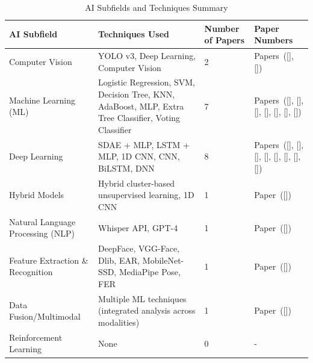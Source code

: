 \documentclass[twocolumn,12pt]{article}
\begin{document}
{\vspace{1em} %

\begin{table}[H]
\centering
\footnotesize               %
\setlength{\tabcolsep}{2pt} %
\renewcommand{\arraystretch}{.5} %
\caption{AI Subfields and Techniques Summary}
\begin{tabular}{|p{2cm}|p{3cm}|p{1.5cm}|p{2.5cm}|}
\hline
\textbf{AI Subfield} & \textbf{Techniques Used} & \textbf{Number of Papers} & \textbf{Paper Numbers} \\
\hline
Computer Vision & YOLO v3, Deep Learning, Computer Vision & 2 & Papers~([\citealp{ref1}], [\citealp{ref8}]) \\
\hline
Machine Learning (ML) & Logistic Regression, SVM, Decision Tree, KNN, AdaBoost, MLP, Extra Tree Classifier, Voting Classifier & 7 & Papers~([\citealp{ref2}], [\citealp{ref3}], [\citealp{ref7}], [\citealp{ref9}], [\citealp{ref10}], [\citealp{ref12}], [\citealp{ref13}]) \\
\hline
Deep Learning & SDAE + MLP, LSTM + MLP, 1D CNN, CNN, BiLSTM, DNN & 8 & Papers~([\citealp{ref3}], [\citealp{ref4}], [\citealp{ref6}], [\citealp{ref8}], [\citealp{ref11}], [\citealp{ref12}], [\citealp{ref18}], [\citealp{ref19}]) \\
\hline
Hybrid Models & Hybrid cluster-based unsupervised learning, 1D CNN & 1 & Paper~([\citealp{ref4}]) \\
\hline
Natural Language Processing (NLP) & Whisper API, GPT-4 & 1 & Paper~([\citealp{ref6}]) \\
\hline
Feature Extraction \& Recognition & DeepFace, VGG-Face, Dlib, EAR, MobileNet-SSD, MediaPipe Pose, FER & 1 & Paper~([\citealp{ref6}]) \\
\hline
Data Fusion/Multimodal & Multiple ML techniques (integrated analysis across modalities) & 1 & Paper~([\citealp{ref7}]) \\
\hline
Reinforcement Learning & None & 0 & - \\
\hline
\end{tabular}
\label{tab:ai_subfields}
\end{table}


}
\end{document}
